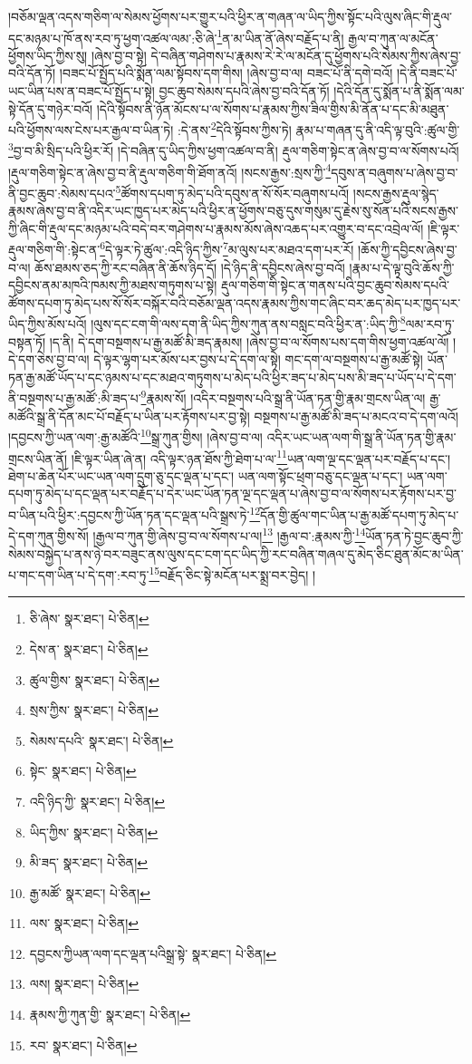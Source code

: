 །བཅོམ་ལྡན་འདས་གཅིག་ལ་སེམས་ཕྱོགས་པར་གྱུར་པའི་ཕྱིར་ན་གཞན་ལ་ཡིད་ཀྱིས་སྟོང་པའི་ལུས་ཞིང་གི་རྡུལ་དང་མཉམ་པ་ཁོ་ནས་རབ་ཏུ་ཕྱག་འཚལ་ལམ་:ཅི་ཞེ་\footnote{ཅི་ཞེས་  སྣར་ཐང་།  པེ་ཅིན། }ན་མ་ཡིན་ནོ་ཞེས་བརྗོད་པ་ནི། རྒྱལ་བ་ཀུན་ལ་མངོན་ཕྱོགས་ཡིད་ཀྱིས་སུ། །ཞེས་བྱ་བ་སྟེ། དེ་བཞིན་གཤེགས་པ་རྣམས་རེ་རེ་ལ་མངོན་དུ་ཕྱོགས་པའི་སེམས་ཀྱིས་ཞེས་བྱ་བའི་དོན་ཏོ། །བཟང་པོ་སྤྱོད་པའི་སྨོན་ལམ་སྟོབས་དག་གིས། །ཞེས་བྱ་བ་ལ། བཟང་པོ་ནི་དགེ་བའོ། །དེ་ནི་བཟང་པོ་ཡང་ཡིན་པས་ན་བཟང་པོ་སྤྱོད་པ་སྟེ། བྱང་ཆུབ་སེམས་དཔའི་ཞེས་བྱ་བའི་དོན་ཏོ། །དེའི་དོན་དུ་སྨོན་པ་ནི་སྨོན་ལམ་སྟེ་དོན་དུ་གཉེར་བའོ། །དེའི་སྟོབས་ནི་ཉོན་མོངས་པ་ལ་སོགས་པ་རྣམས་ཀྱིས་ཟིལ་གྱིས་མི་ནོན་པ་དང་མི་མཐུན་པའི་ཕྱོགས་ལས་ངེས་པར་རྒྱལ་བ་ཡིན་ཏེ། :དེ་ནས་\footnote{དེས་ན་  སྣར་ཐང་།  པེ་ཅིན། }དེའི་སྟོབས་ཀྱིས་ཏེ། རྣམ་པ་གཞན་དུ་ནི་འདི་ལྟ་བུའི་:ཚུལ་གྱི་\footnote{ཚུལ་གྱིས་  སྣར་ཐང་།  པེ་ཅིན། }བྱ་བ་མི་སྲིད་པའི་ཕྱིར་རོ། །དེ་བཞིན་དུ་ཡིད་ཀྱིས་ཕྱག་འཚལ་བ་ནི། རྡུལ་གཅིག་སྟེང་ན་ཞེས་བྱ་བ་ལ་སོགས་པའོ། །རྡུལ་གཅིག་སྟེང་ན་ཞེས་བྱ་བ་ནི་རྡུལ་གཅིག་གི་ཐོག་ནའོ། །སངས་རྒྱས་:སྲས་ཀྱི་\footnote{སྲས་ཀྱིས་  སྣར་ཐང་།  པེ་ཅིན། }དབུས་ན་བཞུགས་པ་ཞེས་བྱ་བ་ནི་བྱང་ཆུབ་:སེམས་དཔའ་\footnote{སེམས་དཔའི་  སྣར་ཐང་།  པེ་ཅིན། }ཚོགས་དཔག་ཏུ་མེད་པའི་དབུས་ན་སོ་སོར་བཞུགས་པའོ། །སངས་རྒྱས་རྡུལ་སྙེད་རྣམས་ཞེས་བྱ་བ་ནི་འདིར་ཡང་ཁྱད་པར་མེད་པའི་ཕྱིར་ན་ཕྱོགས་བཅུ་དུས་གསུམ་དུ་རྗེས་སུ་སོན་པའི་སངས་རྒྱས་ཀྱི་ཞིང་གི་རྡུལ་དང་མཉམ་པའི་བདེ་བར་གཤེགས་པ་རྣམས་མོས་ཞེས་འཆད་པར་འགྱུར་བ་དང་འབྲེལ་ལོ། །ཇི་ལྟར་རྡུལ་གཅིག་གི་:སྟེང་ན་\footnote{སྟེང་  སྣར་ཐང་།  པེ་ཅིན། }དེ་ལྟར་ཏེ་ཚུལ་:འདི་ཉིད་ཀྱིས་\footnote{འདི་ཉིད་ཀྱི་  སྣར་ཐང་།  པེ་ཅིན། }མ་ལུས་པར་མཐའ་དག་པར་རོ། །ཆོས་ཀྱི་དབྱིངས་ཞེས་བྱ་བ་ལ། ཆོས་ཐམས་ཅད་ཀྱི་རང་བཞིན་ནི་ཆོས་ཉིད་དོ། །དེ་ཉིད་ནི་དབྱིངས་ཞེས་བྱ་བའོ། །རྣམ་པ་དེ་ལྟ་བུའི་ཆོས་ཀྱི་དབྱིངས་ནམ་མཁའི་ཁམས་ཀྱི་མཐས་གཏུགས་པ་སྟེ། རྡུལ་གཅིག་གི་སྟེང་ན་གནས་པའི་བྱང་ཆུབ་སེམས་དཔའི་ཚོགས་དཔག་ཏུ་མེད་པས་སོ་སོར་བསྐོར་བའི་བཅོམ་ལྡན་འདས་རྣམས་ཀྱིས་གང་ཞིང་བར་ཆད་མེད་པར་ཁྱད་པར་ཡིད་ཀྱིས་མོས་པའོ། །ལུས་དང་ངག་གི་ལས་དག་ནི་ཡིད་ཀྱིས་ཀུན་ནས་བསླང་བའི་ཕྱིར་ན་:ཡིད་ཀྱི་\footnote{ཡིད་ཀྱིས་  སྣར་ཐང་།  པེ་ཅིན། }ལམ་རབ་ཏུ་བསྟན་ཏོ། །ད་ནི། དེ་དག་བསྔགས་པ་རྒྱ་མཚོ་མི་ཟད་རྣམས། །ཞེས་བྱ་བ་ལ་སོགས་པས་དག་གིས་ཕྱག་འཚལ་ལོ། །དེ་དག་ཅེས་བྱ་བ་ལ། དེ་ལྟར་ལྷག་པར་མོས་པར་བྱས་པ་དེ་དག་ལ་སྟེ། གང་དག་ལ་བསྔགས་པ་རྒྱ་མཚོ་སྟེ། ཡོན་ཏན་རྒྱ་མཚོ་ཡོད་པ་དང་ཉམས་པ་དང་མཐའ་གཏུགས་པ་མེད་པའི་ཕྱིར་ཟད་པ་མེད་པས་མི་ཟད་པ་ཡོད་པ་དེ་དག་ནི་བསྔགས་པ་རྒྱ་མཚོ་:མི་ཟད་པ་\footnote{མི་ཟད་  སྣར་ཐང་།  པེ་ཅིན། }རྣམས་སོ། །འདིར་བསྔགས་པའི་སྒྲ་ནི་ཡོན་ཏན་གྱི་རྣམ་གྲངས་ཡིན་ལ། རྒྱ་མཚོའི་སྒྲ་ནི་དོན་མང་པོ་བརྗོད་པ་ཡིན་པར་རྟོགས་པར་བྱ་སྟེ། བསྔགས་པ་རྒྱ་མཚོ་མི་ཟད་པ་མངའ་བ་དེ་དག་ལའོ། །དབྱངས་ཀྱི་ཡན་ལག་:རྒྱ་མཚོའི་\footnote{རྒྱ་མཚོ་  སྣར་ཐང་།  པེ་ཅིན། }སྒྲ་ཀུན་གྱིས། །ཞེས་བྱ་བ་ལ། འདིར་ཡང་ཡན་ལག་གི་སྒྲ་ནི་ཡོན་ཏན་གྱི་རྣམ་གྲངས་ཡིན་ནོ། །ཇི་ལྟར་ཡིན་ཞེ་ན། འདི་ལྟར་ཉན་ཐོས་ཀྱི་ཐེག་པ་ལ་\footnote{ལས་  སྣར་ཐང་།  པེ་ཅིན། }ཡན་ལག་ལྔ་དང་ལྡན་པར་བརྗོད་པ་དང་། ཐེག་པ་ཆེན་པོར་ཡང་ཡན་ལག་དྲུག་ཅུ་དང་ལྡན་པ་དང་། ཡན་ལག་སྟོང་ཕྲག་བཅུ་དང་ལྡན་པ་དང་། ཡན་ལག་དཔག་ཏུ་མེད་པ་དང་ལྡན་པར་བརྗོད་པ་དེར་ཡང་ཡོན་ཏན་ལྔ་དང་ལྡན་པ་ཞེས་བྱ་བ་ལ་སོགས་པར་རྟོགས་པར་བྱ་བ་ཡིན་པའི་ཕྱིར་:དབྱངས་ཀྱི་ཡོན་ཏན་དང་ལྡན་པའི་སྒྲས་ཏེ་\footnote{དབྱངས་ཀྱིཡན་ལག་དང་ལྡན་པའིསྒྲ་སྟེ་  སྣར་ཐང་།  པེ་ཅིན། }དོན་གྱི་ཚུལ་གང་ཡིན་པ་རྒྱ་མཚོ་དཔག་ཏུ་མེད་པ་དེ་དག་ཀུན་གྱིས་སོ། །རྒྱལ་བ་ཀུན་གྱི་ཞེས་བྱ་བ་ལ་སོགས་པ་ལ།\footnote{ལས།  སྣར་ཐང་།  པེ་ཅིན། } །རྒྱལ་བ་:རྣམས་ཀྱི་\footnote{རྣམས་ཀྱི་ཀུན་གྱི་  སྣར་ཐང་།  པེ་ཅིན། }ཡོན་ཏན་ཏེ་བྱང་ཆུབ་ཀྱི་སེམས་བསྐྱེད་པ་ནས་ཉེ་བར་བཟུང་ནས་ལུས་དང་ངག་དང་ཡིད་ཀྱི་རང་བཞིན་གཞལ་དུ་མེད་ཅིང་ཐུན་མོང་མ་ཡིན་པ་གང་དག་ཡིན་པ་དེ་དག་:རབ་ཏུ་\footnote{རབ་  སྣར་ཐང་།  པེ་ཅིན། }བརྗོད་ཅིང་སྟེ་མངོན་པར་སྨྲ་བར་བྱེད། །
